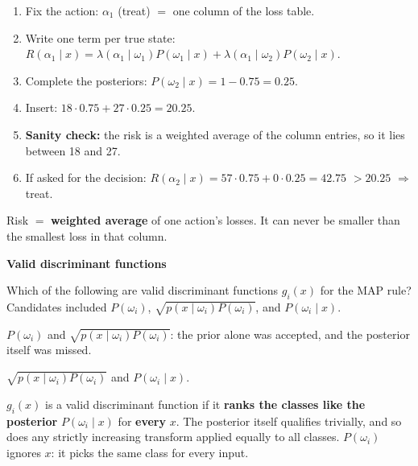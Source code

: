 \documentclass[11pt,a4paper]{article}
\newcommand{\keep}[1]{\par
  \ifdim\dimexpr\pagegoal-\pagetotal\relax<#1\relax\newpage\fi}
\newcommand{\sub}[1]{\keep{6cm}\medskip
  {\sffamily\bfseries\large\color{accent}#1}\par\smallskip}
\begin{document}
\begin{steps}
\begin{enumerate}[leftmargin=*]
  \item Fix the action: $\alpha_1$ (treat) $=$ one column of the loss table.
  \item Write one term per true state: $R(\alpha_1\mid x)=\lambda(\alpha_1\mid\omega_1)P(\omega_1\mid x)+\lambda(\alpha_1\mid\omega_2)P(\omega_2\mid x)$.
  \item Complete the posteriors: $P(\omega_2\mid x)=1-0.75=0.25$.
  \item Insert: $18\cdot0.75+27\cdot0.25=20.25$.
  \item \textbf{Sanity check:} the risk is a weighted average of the column
        entries, so it lies between 18 and 27.
  \item If asked for the decision: $R(\alpha_2\mid x)=57\cdot0.75+0\cdot0.25=42.75$
        $>20.25$ $\Rightarrow$ treat.
\end{enumerate}
\end{steps}

\begin{hook}
Risk $=$ \textbf{weighted average} of one action's losses. It can never be
smaller than the smallest loss in that column.
\end{hook}

\sub{Valid discriminant functions}

\begin{question}
Which of the following are valid discriminant functions $g_i(x)$ for the MAP
rule? Candidates included $P(\omega_i)$, $\sqrt{p(x\mid\omega_i)P(\omega_i)}$,
and $P(\omega_i\mid x)$.
\end{question}
\begin{yours}
$P(\omega_i)$ and $\sqrt{p(x\mid\omega_i)P(\omega_i)}$: the prior alone was
accepted, and the posterior itself was missed.
\end{yours}
\begin{correct}
$\sqrt{p(x\mid\omega_i)P(\omega_i)}$ and $P(\omega_i\mid x)$.
\end{correct}

\begin{why}
$g_i(x)$ is a valid discriminant function if it \textbf{ranks the classes like
the posterior} $P(\omega_i\mid x)$ for \textbf{every} $x$. The posterior itself
qualifies trivially, and so does any strictly increasing transform applied equally
to all classes. $P(\omega_i)$ ignores $x$: it picks the same class for every input.
\end{why}
\end{document}

